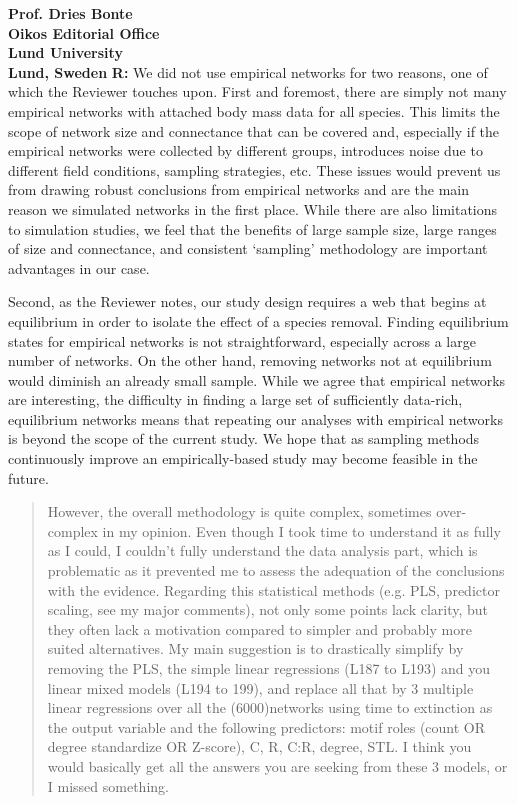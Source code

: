 \documentclass[12pt]{letter}
\begin{document}
\begin{letter}{\bf Prof. Dries Bonte\\
Oikos Editorial Office \\
Lund University \\
Lund, Sweden}
  \textbf{R:} We did not use empirical networks for two reasons, one of which the Reviewer touches upon. First and foremost, there are simply not many empirical networks with attached body mass data for all species. This limits the scope of network size and connectance that can be covered and, especially if the empirical networks were collected by different groups, introduces noise due to different field conditions, sampling strategies, etc. These issues would prevent us from drawing robust conclusions from empirical networks and are the main reason we simulated networks in the first place. While there are also limitations to simulation studies, we feel that the benefits of large sample size, large ranges of size and connectance, and consistent `sampling' methodology are important advantages in our case.
  
  
  Second, as the Reviewer notes, our study design requires a web that begins at equilibrium in order to isolate the effect of a species removal. Finding equilibrium states for empirical networks is not straightforward, especially across a large number of networks. On the other hand, removing networks not at equilibrium would diminish an already small sample. While we agree that empirical networks are interesting, the difficulty in finding a large set of sufficiently data-rich, equilibrium networks means that repeating our analyses with empirical networks is beyond the scope of the current study.
  We hope that as sampling methods continuously improve an empirically-based study may become feasible in the future.



  \begin{quotation}
  However, the overall methodology is quite complex, sometimes over-complex in my opinion. Even though I took time to understand it as fully as I could, I couldn't fully understand the data analysis part, which is problematic as it prevented me to assess the adequation of the conclusions with the evidence. Regarding this statistical methods (e.g. PLS, predictor scaling, see my major comments), not only some points lack clarity, but they often lack a motivation compared to simpler and probably more suited alternatives. My main suggestion is to drastically simplify by removing the PLS, the simple linear regressions (L187 to L193) and you linear mixed models (L194 to 199), and replace all that by 3 multiple linear regressions over all the (6000)networks using time to extinction as the output variable and the following predictors: motif roles (count OR degree standardize OR Z-score), C, R, C:R, degree, STL. I think you would basically get all the answers you are seeking from these 3 models, or I missed something.
  \end{quotation}



\end{letter}
\end{document}
